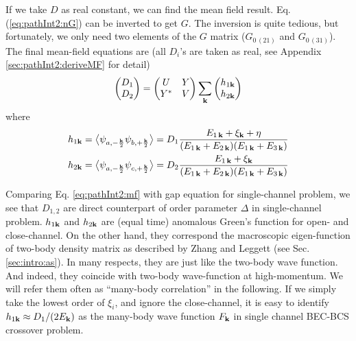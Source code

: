  
  If we take $D$ as real constant,
  we can find the mean field result. Eq. (\ref{eq:pathInt2:nG}) can be inverted to get $G$.  The inversion is quite tedious, but fortunately, we only need two elements of the $G$ matrix ($G_{0\, (21)}$ and $G_{0 \,(31)}$).  The final mean-field equations are (all $D_{i}$'s are taken as real, see Appendix \ref{sec:pathInt2:deriveMF} for detail) 
  \begin{equation}\label{eq:pathInt2:mf}
\begin{pmatrix}D_1\\D_2\end{pmatrix}=\begin{pmatrix}U&Y\\Y^{*}&V\end{pmatrix}\sum_{\mathbf{k}}\begin{pmatrix}h_{1\mathbf{k}}\\h_{2\mathbf{k}}\end{pmatrix}
\end{equation}
  where 
  \begin{gather}
  h_{1\mathbf{k}}=\bigl<{\psi_{a,-\frac{\mathbf{k}}{2}}\psi_{b,+\frac{\mathbf{k}}{2}}}\bigr>
  =D_{1}\frac{E_{1\,\mathbf{k}}+\xi_{\mathbf{k}}+\eta}{(E_{1\,\mathbf{k}}+E_{2\,\mathbf{k}})(E_{1\,\mathbf{k}}+E_{3\,\mathbf{k}})}\label{eq:pathInt2:h1}\\
  h_{2\mathbf{k}}=\bigl<{\psi_{a,-\frac{\mathbf{k}}{2}}\psi_{c,+\frac{\mathbf{k}}{2}}}\bigr>
  =D_{2}\frac{E_{1\,\mathbf{k}}+\xi_{\mathbf{k}}}{(E_{1\,\mathbf{k}}+E_{2\,\mathbf{k}})(E_{1\,\mathbf{k}}+E_{3\,\mathbf{k}})}\label{eq:pathInt2:h2}
  \end{gather}


Comparing Eq. \ref{eq:pathInt2:mf} with gap equation for single-channel problem, we  see that $D_{1,2}$ are  direct counterpart of order parameter $\Delta$ in single-channel problem. 
$h_{1\mathbf{k}}$ and $h_{2\mathbf{k}}$ are (equal time) anomalous Green's function for open- and close-channel. On the other hand, they correspond the macroscopic eigen-function of two-body density matrix as described by Zhang and Leggett\cite{ZhangThesis,shizhongUniv} (see Sec. \ref{sec:intro:as}). In many respects, they are just like the two-body wave function. And indeed, they coincide with two-body wave-function at high-momentum.  We will refer them often as ``many-body correlation'' in the following.  
If we simply take the lowest order of $\xi_{i}$, and ignore the close-channel, it is easy to identify $h_{1\mathbf{k}}\approx{D_{1}}/(2E_{\mathbf{k}})$ as the many-body wave function $F_{\mathbf{k}}$ in single channel BEC-BCS crossover problem.  


